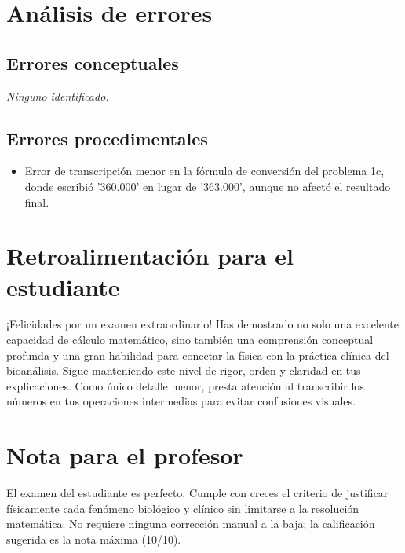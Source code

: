 \documentclass[11pt,a4paper]{article}
\begin{document}
\section*{Análisis de errores}

\subsection*{Errores conceptuales}
\textit{Ninguno identificado.}

\subsection*{Errores procedimentales}
\begin{itemize}[leftmargin=1.5em, itemsep=2pt]
  \item Error de transcripción menor en la fórmula de conversión del problema 1c, donde escribió '360.000' en lugar de '363.000', aunque no afectó el resultado final.
\end{itemize}

\section*{Retroalimentación para el estudiante}
\begin{tcolorbox}[cajaRecomendacion, title={Dirigido a: Shantal Romero}]
¡Felicidades por un examen extraordinario! Has demostrado no solo una excelente capacidad de cálculo matemático, sino también una comprensión conceptual profunda y una gran habilidad para conectar la física con la práctica clínica del bioanálisis. Sigue manteniendo este nivel de rigor, orden y claridad en tus explicaciones. Como único detalle menor, presta atención al transcribir los números en tus operaciones intermedias para evitar confusiones visuales.
\end{tcolorbox}

\section*{Nota para el profesor}
\begin{tcolorbox}[
  enhanced, breakable,
  colback=yellow!8, colframe=yellow!60!black,
  fonttitle=\bfseries, coltitle=black,
  title={Observaciones para revisión manual},
  top=4pt, bottom=4pt, left=8pt, right=8pt,
]
El examen del estudiante es perfecto. Cumple con creces el criterio de justificar físicamente cada fenómeno biológico y clínico sin limitarse a la resolución matemática. No requiere ninguna corrección manual a la baja; la calificación sugerida es la nota máxima (10/10).
\end{tcolorbox}
\end{document}
